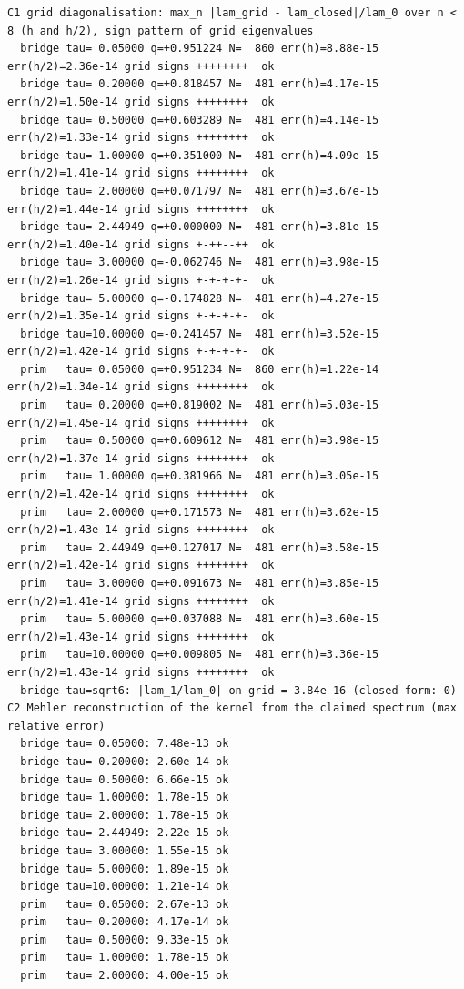 \documentclass[11pt,a4paper]{article}
\begin{document}
\begin{lstlisting}
C1 grid diagonalisation: max_n |lam_grid - lam_closed|/lam_0 over n < 8 (h and h/2), sign pattern of grid eigenvalues
  bridge tau= 0.05000 q=+0.951224 N=  860 err(h)=8.88e-15 err(h/2)=2.36e-14 grid signs ++++++++  ok
  bridge tau= 0.20000 q=+0.818457 N=  481 err(h)=4.17e-15 err(h/2)=1.50e-14 grid signs ++++++++  ok
  bridge tau= 0.50000 q=+0.603289 N=  481 err(h)=4.14e-15 err(h/2)=1.33e-14 grid signs ++++++++  ok
  bridge tau= 1.00000 q=+0.351000 N=  481 err(h)=4.09e-15 err(h/2)=1.41e-14 grid signs ++++++++  ok
  bridge tau= 2.00000 q=+0.071797 N=  481 err(h)=3.67e-15 err(h/2)=1.44e-14 grid signs ++++++++  ok
  bridge tau= 2.44949 q=+0.000000 N=  481 err(h)=3.81e-15 err(h/2)=1.40e-14 grid signs +-++--++  ok
  bridge tau= 3.00000 q=-0.062746 N=  481 err(h)=3.98e-15 err(h/2)=1.26e-14 grid signs +-+-+-+-  ok
  bridge tau= 5.00000 q=-0.174828 N=  481 err(h)=4.27e-15 err(h/2)=1.35e-14 grid signs +-+-+-+-  ok
  bridge tau=10.00000 q=-0.241457 N=  481 err(h)=3.52e-15 err(h/2)=1.42e-14 grid signs +-+-+-+-  ok
  prim   tau= 0.05000 q=+0.951234 N=  860 err(h)=1.22e-14 err(h/2)=1.34e-14 grid signs ++++++++  ok
  prim   tau= 0.20000 q=+0.819002 N=  481 err(h)=5.03e-15 err(h/2)=1.45e-14 grid signs ++++++++  ok
  prim   tau= 0.50000 q=+0.609612 N=  481 err(h)=3.98e-15 err(h/2)=1.37e-14 grid signs ++++++++  ok
  prim   tau= 1.00000 q=+0.381966 N=  481 err(h)=3.05e-15 err(h/2)=1.42e-14 grid signs ++++++++  ok
  prim   tau= 2.00000 q=+0.171573 N=  481 err(h)=3.62e-15 err(h/2)=1.43e-14 grid signs ++++++++  ok
  prim   tau= 2.44949 q=+0.127017 N=  481 err(h)=3.58e-15 err(h/2)=1.42e-14 grid signs ++++++++  ok
  prim   tau= 3.00000 q=+0.091673 N=  481 err(h)=3.85e-15 err(h/2)=1.41e-14 grid signs ++++++++  ok
  prim   tau= 5.00000 q=+0.037088 N=  481 err(h)=3.60e-15 err(h/2)=1.43e-14 grid signs ++++++++  ok
  prim   tau=10.00000 q=+0.009805 N=  481 err(h)=3.36e-15 err(h/2)=1.43e-14 grid signs ++++++++  ok
  bridge tau=sqrt6: |lam_1/lam_0| on grid = 3.84e-16 (closed form: 0)
C2 Mehler reconstruction of the kernel from the claimed spectrum (max relative error)
  bridge tau= 0.05000: 7.48e-13 ok
  bridge tau= 0.20000: 2.60e-14 ok
  bridge tau= 0.50000: 6.66e-15 ok
  bridge tau= 1.00000: 1.78e-15 ok
  bridge tau= 2.00000: 1.78e-15 ok
  bridge tau= 2.44949: 2.22e-15 ok
  bridge tau= 3.00000: 1.55e-15 ok
  bridge tau= 5.00000: 1.89e-15 ok
  bridge tau=10.00000: 1.21e-14 ok
  prim   tau= 0.05000: 2.67e-13 ok
  prim   tau= 0.20000: 4.17e-14 ok
  prim   tau= 0.50000: 9.33e-15 ok
  prim   tau= 1.00000: 1.78e-15 ok
  prim   tau= 2.00000: 4.00e-15 ok

\end{lstlisting}
\end{document}
